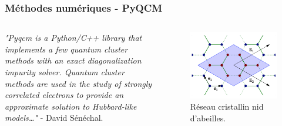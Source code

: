 \begin{frame}
    \frametitle{Méthodes numériques - PyQCM}
        \begin{columns}
            {\scriptsize
            \textit{"Pyqcm is a Python/C++ library that implements a few quantum
            cluster methods with an exact diagonalization impurity solver. Quantum
            cluster methods are used in the study of strongly correlated electrons
            to provide an approximate solution to Hubbard-like models\dots"} - David Sénéchal.
            }
            \begin{figure}
                 \centering
                 \includegraphics[scale=0.15]{./figures/theory/h8.png}
                 \caption{Réseau cristallin nid d'abeilles\footnotemark.}
                 \label{fig: pyqcm}
            \end{figure}
        \end{columns}
\end{frame}
